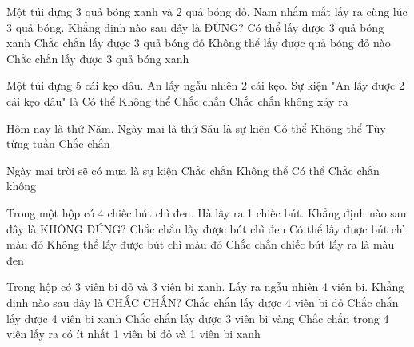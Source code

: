 \begin{ex} %
Một túi đựng 3 quả bóng xanh và 2 quả bóng đỏ. Nam nhắm mắt lấy ra cùng lúc 3 quả bóng. Khẳng định nào sau đây là ĐÚNG?
\choice
{\True Có thể lấy được 3 quả bóng xanh}
{Chắc chắn lấy được 3 quả bóng đỏ}
{Không thể lấy được quả bóng đỏ nào}
{Chắc chắn lấy được 3 quả bóng xanh}
\end{ex}

\begin{ex} %
Một túi đựng 5 cái kẹo dâu. An lấy ngẫu nhiên 2 cái kẹo. Sự kiện "An lấy được 2 cái kẹo dâu" là
\choice
{Có thể}
{Không thể}
{\True Chắc chắn}
{Chắc chắn không xảy ra}
\end{ex}

\begin{ex} %
Hôm nay là thứ Năm. Ngày mai là thứ Sáu là sự kiện
\choice
{Có thể}
{Không thể}
{Tùy từng tuần}
{\True Chắc chắn}
\end{ex}

\begin{ex} %
Ngày mai trời sẽ có mưa là sự kiện
\choice
{Chắc chắn}
{Không thể}
{\True Có thể}
{Chắc chắn không}
\end{ex}

\begin{ex} %
Trong một hộp có 4 chiếc bút chì đen. Hà lấy ra 1 chiếc bút. Khẳng định nào sau đây là KHÔNG ĐÚNG?
\choice
{Chắc chắn lấy được bút chì đen}
{\True Có thể lấy được bút chì màu đỏ}
{Không thể lấy được bút chì màu đỏ}
{Chắc chắn chiếc bút lấy ra là màu đen}
\end{ex}

\begin{ex} %
Trong hộp có 3 viên bi đỏ và 3 viên bi xanh. Lấy ra ngẫu nhiên 4 viên bi. Khẳng định nào sau đây là CHẮC CHẮN?
\choice
{Chắc chắn lấy được 4 viên bi đỏ}
{Chắc chắn lấy được 4 viên bi xanh}
{Chắc chắn lấy được 3 viên bi vàng}
{\True Chắc chắn trong 4 viên lấy ra có ít nhất 1 viên bi đỏ và 1 viên bi xanh}
\end{ex}


